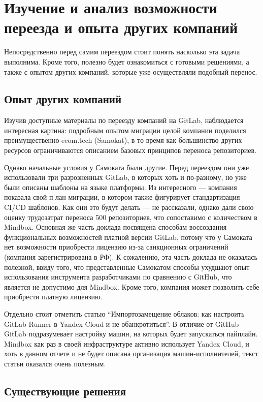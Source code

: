 \chapter{Изучение и анализ возможности переезда и опыта других компаний} \label{ch:ch1}
Непосредственно перед самим переездом стоит понять насколько эта задача выполнима.
Кроме того, полезно будет ознакомиться с готовыми решениями, а также с опытом других компаний, которые уже осуществляли подобный перенос.

\section{Опыт других компаний}\label{sec:other-companies-expirience}
Изучив доступные материалы по переезду компаний на GitLab,
наблюдается интересная картина: подробным опытом миграции целой компании поделился преимущественно ecom.tech (Samokat)\cite{samokat-conference-talk},
в то время как большинство других ресурсов ограничиваются описанием базовых принципов переноса репозиториев.

Однако начальные условия у Самоката были другие.
Перед переездом они уже использовали три разрозненных GitLab, в которых хоть и по-разному, но уже были описаны шаблоны на языке платформы.
Из интересного — компания показала свой п лан миграции, в котором также фигурирует стандартизация CI/CD шаблонов.
Как они это будут делать — не рассказали, однако дали свою оценку трудозатрат переноса 500 репозиториев, что сопоставимо с количеством в Mindbox.
Основная же часть доклада посвящена способам воссоздания функциональных возможностей платной версии GitLab, потому что у
Самоката нет возможности приобрести лицензию из-за санкционных ограничений (компания зарегистрирована в РФ).
К сожалению, эта часть доклада не оказалась полезной,
ввиду того, что представленные Самокатом способы ухудшают опыт использования инструмента разработчиками по сравнению с GitHub,
что является не допустимо для Mindbox.
Кроме того, компания может позволить себе приобрести платную лицензию.

Отдельно стоит отметить статью \enquote{Импортозамещение облаков: как настроить GitLab Runner в Yandex Cloud и не обанкротиться}.
В отличие от GitHub GitLab подразумевает настройку машин, на которых будет запускаться пайплайн.
Mindbox как раз в своей инфраструктуре активно использует Yandex Cloud, и хоть в данном отчете и не будет описана организация машин-исполнителей,
текст статьи оказался очень полезным.

\section{Существующие решения}\label{sec:existing-solutions}

